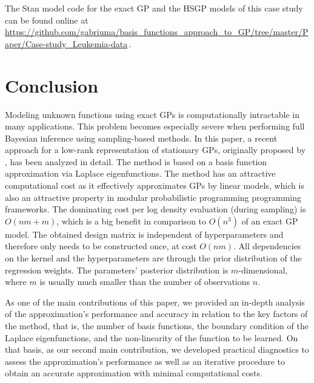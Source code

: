 The Stan model code for the exact GP and the HSGP models of this case study can be found online at {\small \url{https://github.com/gabriuma/basis_functions_approach_to_GP/tree/master/Paper/Case-study_Leukemia-data}}\,.
%

\section{Conclusion}\label{sec_conclusion}

Modeling unknown functions using exact GPs is computationally intractable in many applications. This problem becomes especially severe when performing full Bayesian inference using sampling-based methods. In this paper, a recent approach for a low-rank representation of stationary GPs, originally proposed by \citet{solin2018hilbert}, has been analyzed in detail. The method is based on a basis function approximation via Laplace eigenfunctions. The method has an attractive computational cost as it effectively approximates GPs by linear models, which is also an attractive property in modular probabilistic programming programming frameworks. The dominating cost per log density evaluation (during sampling) is $O(nm+m)$, which is a big benefit in comparison to $O(n^3)$ of an exact GP model. The obtained design matrix is independent of hyperparameters and therefore only needs to be constructed once, at cost $O(nm)$. All dependencies on the kernel and the hyperparameters are through the prior distribution of the regression weights. The parameters' posterior distribution is $m$-dimensional, where $m$ is usually much smaller than the number of observations $n$. 

As one of the main contributions of this paper, we provided an in-depth analysis of the approximation's performance and accuracy in relation to the key factors of the method, that is, the number of basis functions, the boundary condition of the Laplace eigenfunctions, and the non-linearity of the function to be learned. On that basis, as our second main contribution, we developed practical diagnostics to assess the approximation's performance as well as an iterative procedure to obtain an accurate approximation with minimal computational costs. 

